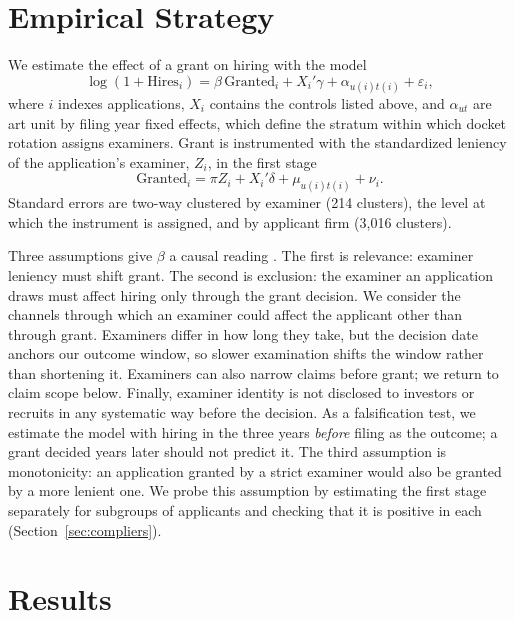 \documentclass[11pt]{article}
\begin{document}
\section{Empirical Strategy}

We estimate the effect of a grant on hiring with the model
\begin{equation}
\log(1 + \text{Hires}_{i}) = \beta\,\text{Granted}_{i} + X_{i}'\gamma + \alpha_{u(i)t(i)} + \varepsilon_{i},
\end{equation}
where $i$ indexes applications, $X_i$ contains the controls listed above, and $\alpha_{ut}$ are art unit by filing year fixed effects, which define the stratum within which docket rotation assigns examiners. Grant is instrumented with the standardized leniency of the application's examiner, $Z_i$, in the first stage
\begin{equation}
\text{Granted}_{i} = \pi Z_{i} + X_{i}'\delta + \mu_{u(i)t(i)} + \nu_{i}.
\end{equation}
Standard errors are two-way clustered by examiner (214 clusters), the level at which the instrument is assigned, and by applicant firm (3,016 clusters).

Three assumptions give $\beta$ a causal reading \citep{imbens1994}. The first is relevance: examiner leniency must shift grant. The second is exclusion: the examiner an application draws must affect hiring only through the grant decision. We consider the channels through which an examiner could affect the applicant other than through grant. Examiners differ in how long they take, but the decision date anchors our outcome window, so slower examination shifts the window rather than shortening it. Examiners can also narrow claims before grant; we return to claim scope below. Finally, examiner identity is not disclosed to investors or recruits in any systematic way before the decision. As a falsification test, we estimate the model with hiring in the three years \textit{before} filing as the outcome; a grant decided years later should not predict it. The third assumption is monotonicity: an application granted by a strict examiner would also be granted by a more lenient one. We probe this assumption by estimating the first stage separately for subgroups of applicants and checking that it is positive in each (Section~\ref{sec:compliers}).

\section{Results}
\end{document}
